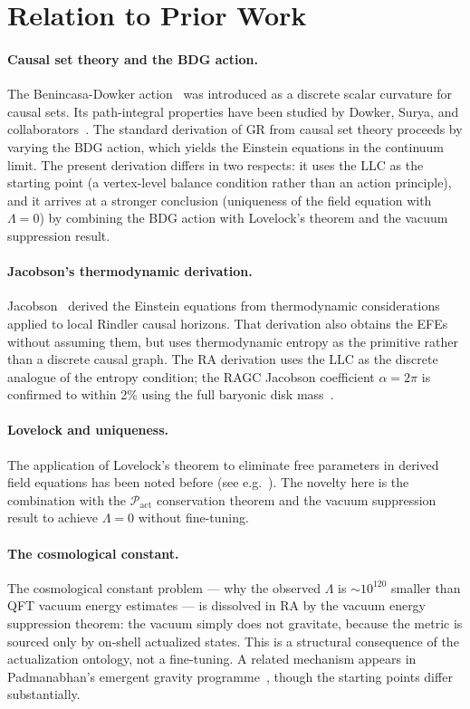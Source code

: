 \documentclass[11pt,a4paper]{article}
\newcommand{\Pact}{\mathcal{P}_{\mathrm{act}}}
\begin{document}
\section{Relation to Prior Work}
\label{sec:related}

\paragraph{Causal set theory and the BDG action.}
The Benincasa-Dowker action~\citep{Benincasa2010} was introduced as a
discrete scalar curvature for causal sets. Its path-integral
properties have been studied by Dowker, Surya, and
collaborators~\citep{Dowker2013}. The standard derivation of GR from
causal set theory proceeds by varying the BDG action, which yields
the Einstein equations in the continuum limit. The present derivation
differs in two respects: it uses the LLC as the starting point (a
vertex-level balance condition rather than an action principle), and
it arrives at a stronger conclusion (uniqueness of the field equation
with $\Lambda = 0$) by combining the BDG action with Lovelock's theorem
and the vacuum suppression result.

\paragraph{Jacobson's thermodynamic derivation.}
Jacobson~\citep{Jacobson1995} derived the Einstein equations from
thermodynamic considerations applied to local Rindler causal horizons.
That derivation also obtains the EFEs without assuming them, but
uses thermodynamic entropy as the primitive rather than a discrete
causal graph. The RA derivation uses the LLC as the discrete analogue
of the entropy condition; the RAGC Jacobson coefficient
$\alpha = 2\pi$ is confirmed to within 2\% using the full baryonic
disk mass~\citep{Sandeman2026RAGC,BlandHawthorn2016}.

\paragraph{Lovelock and uniqueness.}
The application of Lovelock's theorem to eliminate free parameters in
derived field equations has been noted before (see e.g.~\citep{Padmanabhan2013}).
The novelty here is the combination with the $\Pact$ conservation
theorem and the vacuum suppression result to achieve $\Lambda = 0$
without fine-tuning.

\paragraph{The cosmological constant.}
The cosmological constant problem --- why the observed $\Lambda$ is
$\sim10^{120}$ smaller than QFT vacuum energy estimates --- is
dissolved in RA by the vacuum energy suppression theorem: the vacuum
simply does not gravitate, because the metric is sourced only by
on-shell actualized states. This is a structural consequence of the
actualization ontology, not a fine-tuning. A related mechanism appears
in Padmanabhan's emergent gravity programme~\citep{Padmanabhan2013},
though the starting points differ substantially.
\end{document}
